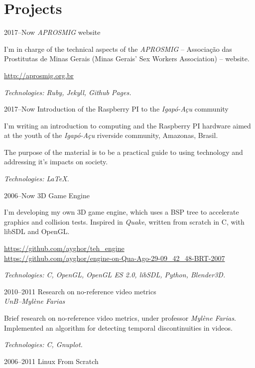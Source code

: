 \documentclass[a4paper]{simplecv}
\begin{document}
\section{Projects}

\begin{topic}
\item[2017--Now] \emph{APROSMIG} website

	I'm in charge of the technical aspects of the \emph{APROSMIG} --
	Associação das Prostitutas de Minas Gerais (Minas Gerais' Sex Workers
	Association) -- website.

	{\scriptsize\url{http://aprosmig.org.br}}

	{\em\scriptsize Technologies: Ruby, Jekyll, Github Pages.}

\item[2017--Now] Introduction of the Raspberry PI to the \emph{Igapó-Açu} community

	I'm writing an introduction to computing and the Raspberry PI hardware
	aimed at the youth of the \emph{Igapó-Açu} riverside community,
	Amazonas, Brasil.

	The purpose of the material is to be a practical guide to using
	technology and addressing it's impacts on society.

	{\em\scriptsize Technologies: \LaTeX{}.}

\item[2006--Now] 3D Game Engine

	I'm developing my own 3D game engine, which uses a BSP tree to
	accelerate graphics and collision tests. Inspired in \emph{Quake},
	written from scratch in C, with libSDL and OpenGL.

	{\scriptsize\url{https://github.com/ayghor/teh_engine}}\\
	{\scriptsize\url{https://github.com/ayghor/engine-on-Qua-Ago-29-09\_42\_48-BRT-2007}}

	{\em\scriptsize Technologies: C, OpenGL, OpenGL ES 2.0, libSDL, Python,
	Blender3D.}

\item[2010--2011] Research on no-reference video metrics\\
	{\em\small UnB--Mylène Farias}

	Brief research on no-reference video metrics, under professor
	\emph{Mylène Farias}. Implemented an algorithm for detecting temporal
	discontinuities in videos.

	{\em\scriptsize Technologies: C, Gnuplot.}

\item[2006--2011] Linux From Scratch


\end{topic}
\end{document}
